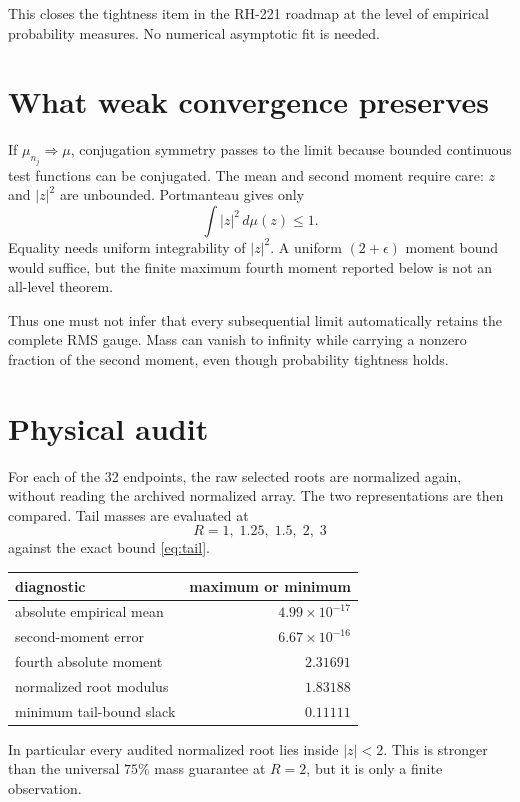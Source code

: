 \documentclass[11pt]{article}
\theoremstyle{remark}\newtheorem{remark}[theorem]{Remark}
\begin{document}
This closes the tightness item in the RH-221 roadmap at the level of empirical
probability measures. No numerical asymptotic fit is needed.

\section{What weak convergence preserves}

If $\mu_{n_j}\Rightarrow\mu$, conjugation symmetry passes to the limit because
bounded continuous test functions can be conjugated. The mean and second
moment require care: $z$ and $|z|^2$ are unbounded. Portmanteau gives only
\begin{equation}
 \int |z|^2\,d\mu(z)\le1.
\end{equation}
Equality needs uniform integrability of $|z|^2$. A uniform $(2+\epsilon)$
moment bound would suffice, but the finite maximum fourth moment reported
below is not an all-level theorem.

Thus one must not infer that every subsequential limit automatically retains
the complete RMS gauge. Mass can vanish to infinity while carrying a
nonzero fraction of the second moment, even though probability tightness
holds.

\section{Physical audit}

For each of the 32 endpoints, the raw selected roots are normalized again,
without reading the archived normalized array. The two representations are
then compared. Tail masses are evaluated at
\[
 R=1,\;1.25,\;1.5,\;2,\;3
\]
against the exact bound \eqref{eq:tail}.

\begin{center}
\begin{tabular}{lr}
\toprule
diagnostic & maximum or minimum\\
\midrule
absolute empirical mean & $4.99\times10^{-17}$\\
second-moment error & $6.67\times10^{-16}$\\
fourth absolute moment & $2.31691$\\
normalized root modulus & $1.83188$\\
minimum tail-bound slack & $0.11111$\\
\bottomrule
\end{tabular}
\end{center}

In particular every audited normalized root lies inside $|z|<2$. This is
stronger than the universal $75\%$ mass guarantee at $R=2$, but it is only a
finite observation.
\end{document}
